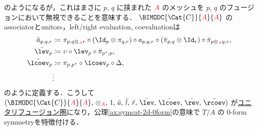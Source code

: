 \documentclass[TQFT_main]{subfiles}
\begin{document}
のようになるが，これはまさに $p,\, q$ に挟まれた $\textcolor{red}{A}$ のメッシュを $p,\, q$ のフュージョンにおいて無視できることを意味する．
$\BIMODC{\Cat{C}}{\textcolor{red}{A}}{\textcolor{red}{A}}$ のassociatorとunitors，left/right evaluation, coevaluationは
\begin{align}
    \tilde{a}_{p,q,r} &\coloneqq \pi_{p,q\otimes_{\textcolor{red}{A}} r} \circ (\Id_{p} \otimes \pi_{q,r}) \circ a_{p,q,r} \circ (\bar{\pi}_{p,q} \otimes \Id_{r}) \circ \bar{\pi}_{p \otimes_{\textcolor{red}{A}} q, r}, \\
    \bar{\lev}_p &\coloneqq \upsilon \circ \lev_p \circ \bar{\pi}_{p^*,p}, \\
    \bar{\lcoev}_p &\coloneqq \pi_{p,p^*} \circ \lcoev_p \circ \Delta, \\
    &\vdots 
\end{align}
のように定義する．こうして $(\BIMODC{\Cat{C}}{\textcolor{red}{A}}{\textcolor{red}{A}},\, \otimes_{\textcolor{red}{A}},\, 1,\, \bar{a},\, \bar{l},\, \bar{r},\, \bar{\lev},\, \bar{\lcoev},\, \bar{\rev},\, \bar{\rcoev})$ が\hyperref[def:tensorfusion-cat]{ユニタリフュージョン圏}になり，公理\ref{ax:symcat-2d-0form}の意味で $T/A$ の $0$-form symmetryを特徴付ける．
\end{document}
